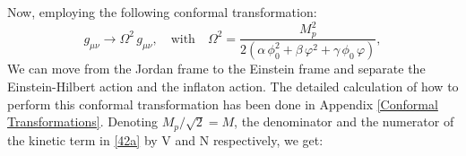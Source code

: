 \documentclass[aps,prd,reprint,preprintnumbers,showpacs,floatfix,nofootinbib,superscript address]{revtex4-2}
\begin{document}

Now, employing the following conformal transformation: 
\[
g_{\mu\nu}\rightarrow \Omega^2\,g_{\mu\nu},\quad\text{with}\quad \Omega^2 = \frac{M_p^2}{2(\alpha\,\phi_0^2+\beta\,\varphi^2+\gamma\,\phi_0\,\varphi)},
\]
We can move from the Jordan frame to the Einstein frame and separate the Einstein-Hilbert action and the inflaton action. The detailed calculation of how to perform this conformal transformation has been done in Appendix \ref{Conformal Transformations}. Denoting $M_p/\sqrt{2} = M$, the denominator and the numerator of the kinetic term in \ref{42a} by V and N respectively, we get:
\end{document}
